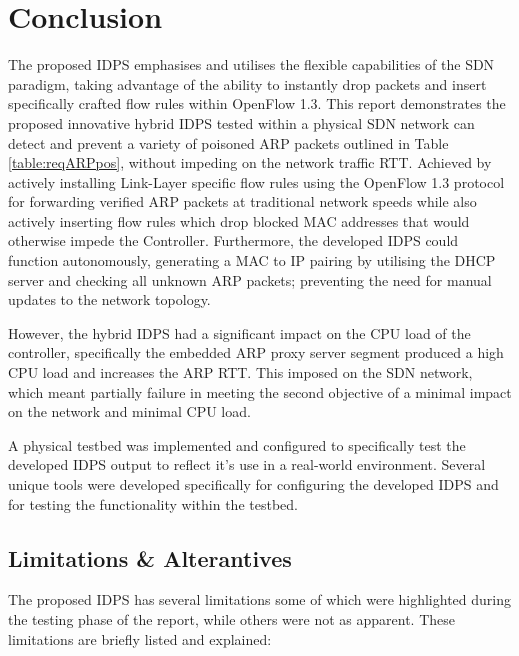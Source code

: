 \documentclass[12pt, oneside]{book}
\begin{document}
\chapter{Conclusion}
The proposed IDPS emphasises and utilises the flexible capabilities of the SDN paradigm, taking advantage
of the ability to instantly drop packets and insert specifically crafted flow rules within OpenFlow 1.3.
This report demonstrates the proposed innovative hybrid IDPS tested within a physical SDN network can
detect and prevent a variety of poisoned ARP packets outlined in Table \ref{table:reqARPpos},
without impeding on the network traffic RTT.
Achieved by actively installing Link-Layer specific flow rules using the OpenFlow 1.3 protocol for 
forwarding verified ARP packets at traditional network speeds while also actively inserting flow rules which
drop blocked MAC addresses that would otherwise impede the Controller. Furthermore, the developed IDPS 
could function autonomously, generating a MAC to IP pairing by utilising the DHCP server and 
checking all unknown ARP packets; preventing the need for manual updates to the network topology.

However, the hybrid IDPS had a significant impact on the CPU load of the controller, specifically the embedded
ARP proxy server segment produced a high CPU load and increases the ARP RTT. This imposed on the SDN network, which
meant partially failure in meeting the second objective of a minimal impact on the network and minimal CPU load.

A physical testbed was implemented and configured to specifically test the developed IDPS output to reflect it's use
 in a real-world environment. Several unique tools were developed specifically 
for configuring the developed IDPS and for testing the functionality within the testbed.


\section{Limitations \& Alterantives}
The proposed IDPS has several limitations some of which were highlighted during the testing phase of the report,
while others were not as apparent. These limitations are briefly listed and explained:
\end{document}
